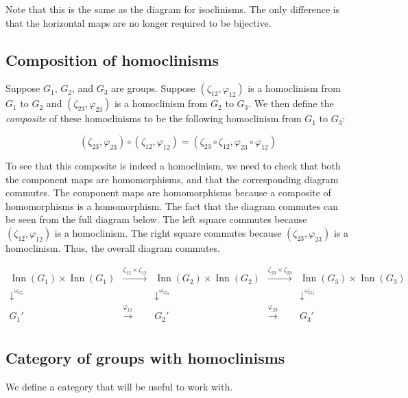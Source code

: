 \documentclass{ucetd}
\begin{document}
Note that this is the same as the diagram for isoclinisms. The only difference is that the horizontal maps are no longer required to be bijective.

\subsection{Composition of homoclinisms}\label{sec:homoclinism-composition}

Suppose $G_1$, $G_2$, and $G_3$ are groups. Suppose
$(\zeta_{12},\varphi_{12})$ is a homoclinism from $G_1$ to $G_2$ and
$(\zeta_{23},\varphi_{23})$ is a homoclinism from $G_2$ to $G_3$. We
then define the {\em composite} of these homoclinisms to be the
following homoclinism from $G_1$ to $G_3$:

$$(\zeta_{23},\varphi_{23}) \circ (\zeta_{12},\varphi_{12}) = (\zeta_{23}\circ \zeta_{12}, \varphi_{23} \circ \varphi_{12})$$

To see that this composite is indeed a homoclinism, we need to check
that both the component maps are homomorphisms, and that the
corresponding diagram commutes. The component maps are homomorphisms
because a composite of homomorphisms is a homomorphism. The fact that
the diagram commutes can be seen from the full diagram below. The left
square commutes because $(\zeta_{12},\varphi_{12})$ is a
homoclinism. The right square commutes because
$(\zeta_{23},\varphi_{23})$ is a homoclinism. Thus, the overall
diagram commutes.

$$\begin{array}{ccccc}
  \operatorname{Inn}(G_1) \times \operatorname{Inn}(G_1) & \stackrel{\zeta_{12} \times \zeta_{12}}{\to} & \operatorname{Inn}(G_2) \times \operatorname{Inn}(G_2) & \stackrel{\zeta_{23} \times \zeta_{23}}{\to} & \operatorname{Inn}(G_3) \times \operatorname{Inn}(G_3)\\
  \downarrow^{\omega_{G_1}}  & & \downarrow^{\omega_{G_2}} & & \downarrow^{\omega_{G_3}}\\
  G_1' & \stackrel{\varphi_{12}}{\to} & G_2' & \stackrel{\varphi_{23}}{\to} & G_3'\\
\end{array}$$

\subsection{Category of groups with homoclinisms}\label{sec:homoclinism-category}

We define a category that will be useful to work with.
\end{document}
